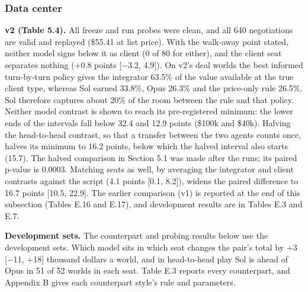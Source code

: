 \subsubsection{Data center}\label{data-center}

\textbf{v2 (Table 5.4).} All freeze and run probes were clean, and all 640 negotiations are valid and replayed (\$55.41 at
list price). With the walk-away point stated, neither model signs below it as client (0 of 80 for either), and the
client seat separates nothing (+0.8 points {[}−3.2, 4.9{]}). On v2's deal worlds the best informed turn-by-turn policy
gives the integrator 63.5\% of the value available at the true client type, whereas Sol earned 33.8\%, Opus 26.3\% and
the price-only rule 26.5\%. Sol therefore captures about 20\% of the room between the rule and that policy. Neither
model contrast is shown to reach its pre-registered minimum: the lower ends of the intervals fall below 32.4 and 12.9
points (\$100k and \$40k). Halving the head-to-head contrast, so that a transfer between the two agents counts once,
halves its minimum to 16.2 points, below which the halved interval also starts (15.7). The halved comparison in
Section 5.1 was made after the runs; its paired p-value is 0.0003. Matching seats as well, by averaging the
integrator and client contrasts against the script (4.1 points {[}0.1, 8.2{]}), widens the paired difference to 16.7
points {[}10.5, 22.9{]}. The earlier
comparison (v1) is reported at the end of this subsection (Tables E.16 and E.17), and development results are in
Tables E.3 and E.7.

\textbf{Development sets.} The counterpart and probing results below use the development sets. Which model sits in which seat changes the
pair's total by +3 {[}−11, +18{]} thousand dollars a world, and in head-to-head play Sol is ahead of Opus in 51 of 52
worlds in each seat. Table E.3 reports every counterpart, and Appendix B gives each counterpart style's rule and
parameters.

